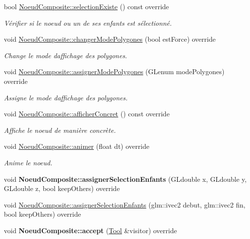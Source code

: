 \begin{DoxyCompactItemize}
bool \hyperlink{group__inf2990_ga3f0b30a39e8e6384e6e3227582c678e0}{Noeud\+Composite\+::selection\+Existe} () const  override
\begin{DoxyCompactList}\small\item\em Vérifier si le noeud ou un de ses enfants est sélectionné. \end{DoxyCompactList}\item 
void \hyperlink{group__inf2990_ga90bb01067866438b80d081967c133b81}{Noeud\+Composite\+::changer\+Mode\+Polygones} (bool est\+Force) override
\begin{DoxyCompactList}\small\item\em Change le mode d\textquotesingle{}affichage des polygones. \end{DoxyCompactList}\item 
void \hyperlink{group__inf2990_ga5caf8a3f9e06915463abdff7a473d95f}{Noeud\+Composite\+::assigner\+Mode\+Polygones} (G\+Lenum mode\+Polygones) override
\begin{DoxyCompactList}\small\item\em Assigne le mode d\textquotesingle{}affichage des polygones. \end{DoxyCompactList}\item 
void \hyperlink{group__inf2990_gaed396ee8ea0396e4a9cf56b69151204b}{Noeud\+Composite\+::afficher\+Concret} () const  override
\begin{DoxyCompactList}\small\item\em Affiche le noeud de manière concrète. \end{DoxyCompactList}\item 
void \hyperlink{group__inf2990_gac641c70147959a57b698854e016ff929}{Noeud\+Composite\+::animer} (float dt) override
\begin{DoxyCompactList}\small\item\em Anime le noeud. \end{DoxyCompactList}\item 
\hypertarget{group__inf2990_ga5fb967a439eb0ea7c326b23ea12700e9}{}void {\bfseries Noeud\+Composite\+::assigner\+Selection\+Enfants} (G\+Ldouble x, G\+Ldouble y, G\+Ldouble z, bool keep\+Others) override\label{group__inf2990_ga5fb967a439eb0ea7c326b23ea12700e9}

\item 
void \hyperlink{group__inf2990_ga98e4e00d1d92ebe6774f72dc712ee6ca}{Noeud\+Composite\+::assigner\+Selection\+Enfants} (glm\+::ivec2 debut, glm\+::ivec2 fin, bool keep\+Others) override
\item 
\hypertarget{group__inf2990_ga0b60c180726f3a0501f42bc70bc0c52e}{}void {\bfseries Noeud\+Composite\+::accept} (\hyperlink{class_tool}{Tool} \&visitor) override\label{group__inf2990_ga0b60c180726f3a0501f42bc70bc0c52e}


\end{DoxyCompactItemize}
